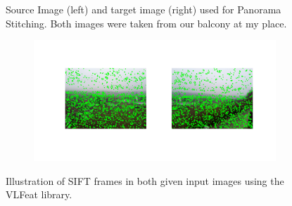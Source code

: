 \documentclass{paper}
\begin{document}
\begin{figure}[H]
    \caption{Source Image (left) and target image (right) used for Panorama Stitching. Both images were taken from our balcony at my place.}
    \label{fig:stitching_input}       
\end{figure}

\begin{figure}[H]
    \centering
    \begin{subfigure}{1.0\textwidth}
        \includegraphics[width=\textwidth]{stitching/sift_frames_input_1}
    \end{subfigure}
    
    \caption{Illustration of SIFT frames in both given input images using the VLFeat library.}
    \label{fig:stitching_sift}       
\end{figure}
\end{document}
